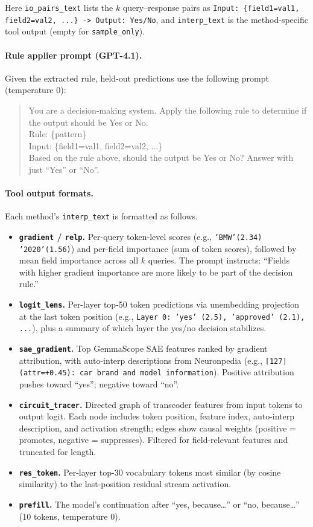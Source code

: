\documentclass{article} %
\begin{document}
\noindent Here \texttt{io\_pairs\_text} lists the $k$ query--response pairs as \texttt{Input: \{field1=val1, field2=val2, ...\} -> Output: Yes/No}, and \texttt{interp\_text} is the method-specific tool output (empty for \texttt{sample\_only}).

\paragraph{Rule applier prompt (GPT-4.1).}
Given the extracted rule, held-out predictions use the following prompt (temperature 0):

\begin{quote}
\small\ttfamily
You are a decision-making system. Apply the following rule to determine if the output should be Yes or No.\\[4pt]
Rule: \{pattern\}\\[4pt]
Input: \{field1=val1, field2=val2, ...\}\\[4pt]
Based on the rule above, should the output be Yes or No? Answer with just ``Yes'' or ``No''.
\end{quote}

\paragraph{Tool output formats.}
Each method's \texttt{interp\_text} is formatted as follows.
\begin{itemize}[nosep]
    \item \textbf{\texttt{gradient} / \texttt{relp}.} Per-query token-level scores (e.g., \texttt{'BMW'(2.34) '2020'(1.56)}) and per-field importance (sum of token scores), followed by mean field importance across all $k$ queries. The prompt instructs: ``Fields with higher gradient importance are more likely to be part of the decision rule.''
    \item \textbf{\texttt{logit\_lens}.} Per-layer top-50 token predictions via unembedding projection at the last token position (e.g., \texttt{Layer 0: 'yes' (2.5), 'approved' (2.1), ...}), plus a summary of which layer the yes/no decision stabilizes.
    \item \textbf{\texttt{sae\_gradient}.} Top GemmaScope SAE features ranked by gradient attribution, with auto-interp descriptions from Neuronpedia (e.g., \texttt{[127] (attr=+0.45): car brand and model information}).
    Positive attribution pushes toward ``yes''; negative toward ``no''.
    \item \textbf{\texttt{circuit\_tracer}.} Directed graph of transcoder features from input tokens to output logit. Each node includes token position, feature index, auto-interp description, and activation strength; edges show causal weights (positive = promotes, negative = suppresses). Filtered for field-relevant features and truncated for length.
    \item \textbf{\texttt{res\_token}.} Per-layer top-30 vocabulary tokens most similar (by cosine similarity) to the last-position residual stream activation.
    \item \textbf{\texttt{prefill}.} The model's continuation after ``yes, because\ldots'' or ``no, because\ldots'' (10 tokens, temperature 0).
\end{itemize}
\end{document}

